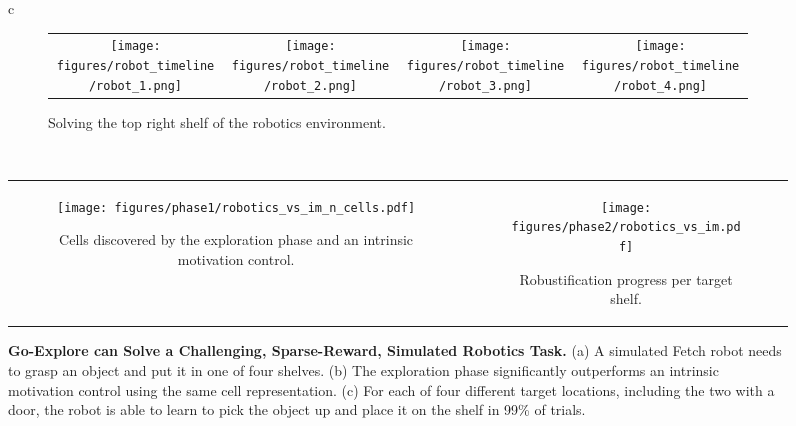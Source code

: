 \documentclass{nature}
\begin{document}
\begin{figure}
    \centering
    \begin{tabular}{c}
        \begin{subfigure}[t]{\textwidth}
            \centering
            \begin{tabular}{cccc}
                \texttt{[image: figures/robot\_timeline/robot\_1.png]} & \texttt{[image: figures/robot\_timeline/robot\_2.png]} &
                \texttt{[image: figures/robot\_timeline/robot\_3.png]} & \texttt{[image: figures/robot\_timeline/robot\_4.png]}
            \end{tabular}
            \caption{Solving the top right shelf of the robotics environment.}
            \label{fig:robotics_picture}
            \vspace{2mm}
        \end{subfigure}
         \\
         \centering
         \begin{tabular}{cc}
            \begin{subfigure}[t]{0.45\linewidth}
                \centering
                \texttt{[image: figures/phase1/robotics\_vs\_im\_n\_cells.pdf]}
                \caption{Cells discovered by the exploration phase and an intrinsic motivation control.}
                \label{fig:robotics_phase1_vs_control}
            \end{subfigure} 
            &
            \centering
            \begin{subfigure}[t]{0.45\linewidth}
                \centering
                \texttt{[image: figures/phase2/robotics\_vs\_im.pdf]}
                \caption{Robustification progress per target shelf.}
                \label{fig:robotics_robustification}
            \end{subfigure}
         \end{tabular}
    \end{tabular}
    \caption{\textbf{Go-Explore can Solve a Challenging, Sparse-Reward, Simulated Robotics Task.}  (a) A simulated Fetch robot needs to grasp an object and put it in one of four shelves. (b) The exploration phase significantly outperforms an intrinsic motivation control using the same cell representation. (c) For each of four different target locations, including the two with a door, the robot is able to learn to pick the object up and place it on the shelf in 99\% of trials.}
    \label{fig:robot}
\end{figure}
\end{document}
